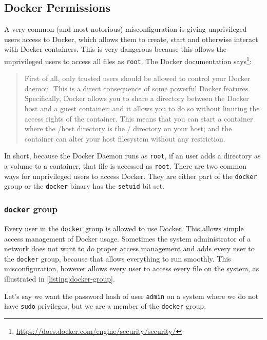 \subsection{Docker Permissions}\label{subsection:docker-permissions}
A very common (and most notorious) misconfiguration is giving unprivileged users access to Docker, which allows them to create, start and otherwise interact with Docker containers. This is very dangerous because this allows the unprivileged users to access all files as \lstinline{root}. The Docker documentation says\footnote{\url{https://docs.docker.com/engine/security/security/}}:
\begin{quote}
First of all, only trusted users should be allowed to control your Docker daemon. This is a direct consequence of some powerful Docker features. Specifically, Docker allows you to share a directory between the Docker host and a guest container; and it allows you to do so without limiting the access rights of the container. This means that you can start a container where the /host directory is the / directory on your host; and the container can alter your host filesystem without any restriction.
\end{quote}

In short, because the Docker Daemon runs as \lstinline{root}, if an user adds a directory as a volume to a container, that file is accessed as \lstinline{root}. There are two common ways for unprivileged users to access Docker. They are either part of the \lstinline{docker} group or the \lstinline{docker} binary has the \lstinline{setuid} bit set.

\subsubsection{\texorpdfstring{\lstinline{docker}}{docker} group}
Every user in the \lstinline{docker} group is allowed to use Docker. This allows simple access management of Docker usage. Sometimes the system administrator of a network does not want to do proper access management and adds every user to the \lstinline{docker} group, because that allows everything to run smoothly. This misconfiguration, however allows every user to access every file on the system, as illustrated in \autoref{listing:docker-group}.

\hfill

Let's say we want the password hash of user \lstinline{admin} on a system where we do not have \lstinline{sudo} privileges, but we are a member of the \lstinline{docker} group.

